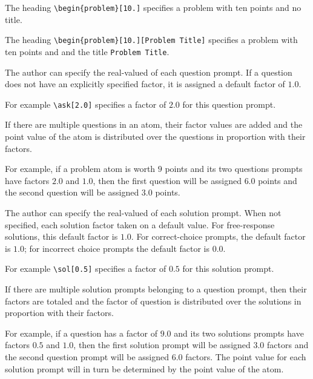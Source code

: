 \begin{example}
The heading
%
 \lstinline`\begin{problem}[10.]` specifies a problem with ten points
   and no title.

The heading
%
\lstinline`\begin{problem}[10.][Problem Title]` 
%
specifies a  problem with ten points and and the title
\lstinline`Problem Title`.
%
\end{example}

\begin{gram}
The author can specify the real-valued  of each question prompt.  
%
If a question does not have an explicitly specified factor, it is
assigned a default factor of $1.0$.

For example 
%
\lstinline`\ask[2.0]` 
%
specifies a factor of $2.0$ for this question prompt. 


If there are multiple questions in an atom, their factor values are
added and the point value of the atom is distributed over the
questions in proportion with their factors.

For example, if a problem atom is worth $9$ points and its two
questions prompts have factors $2.0$ and $1.0$, then the first
question will be assigned $6.0$ points and the second question will be
assigned $3.0$ points.


\end{gram}

\begin{gram}
The author can specify the real-valued  of each solution prompt.  
%
When not specified, each solution factor taken on a default value.
%
For free-response solutions, this default factor is $1.0$.
%
For correct-choice prompts, the default factor is $1.0$; for incorrect
choice prompts the default factor is $0.0$.

For example \lstinline`\sol[0.5]` specifies a factor of $0.5$ for this
solution prompt. 

If there are multiple solution prompts belonging to a question prompt,
then their factors are totaled and the factor of question is distributed
over the solutions in proportion with their factors.  

For example, if a question has a factor of $9.0$ and its two solutions
prompts have factors $0.5$ and $1.0$, then the first solution prompt
will be assigned $3.0$ factors and the second question prompt will be
assigned $6.0$ factors.  The point value for each solution prompt will
in turn be determined by the point value of the atom.


\end{gram}


